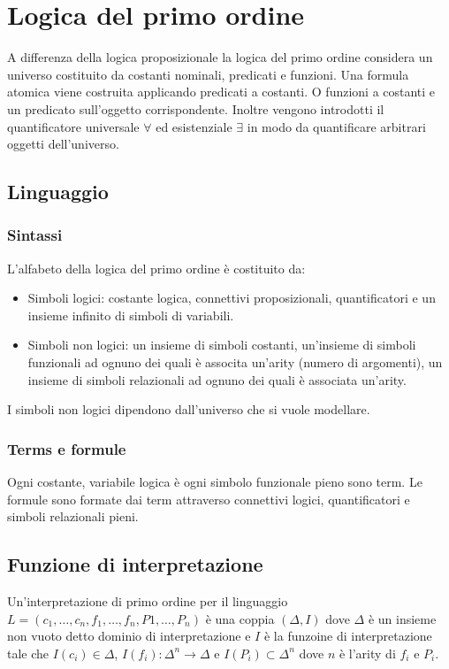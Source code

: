 \chapter{Logica del primo ordine}
A differenza della logica proposizionale la logica del primo ordine considera un universo costituito da costanti nominali, predicati e funzioni. Una formula
atomica viene costruita applicando predicati a costanti. O funzioni a costanti e un predicato sull'oggetto corrispondente. Inoltre vengono introdotti il 
quantificatore universale $\forall$ ed esistenziale $\exists$ in modo da quantificare arbitrari oggetti dell'universo. 
\section{Linguaggio}
\subsection{Sintassi}
L'alfabeto della logica del primo ordine \`e costituito da:
\begin{itemize}
\item Simboli logici: costante logica, connettivi proposizionali, quantificatori e un insieme infinito di simboli di variabili. 
\item Simboli non logici: un insieme di simboli costanti, un'insieme di simboli funzionali ad ognuno dei quali \`e associta un'arity (numero di argomenti), 
un insieme di simboli relazionali ad ognuno dei quali \`e associata un'arity. 
\end{itemize}
I simboli non logici dipendono dall'universo che si vuole modellare.
\subsection{Terms e formule}
Ogni costante, variabile logica \`e ogni simbolo funzionale pieno sono term. Le formule sono formate dai term attraverso connettivi logici, quantificatori e 
simboli relazionali pieni. 
\section{Funzione di interpretazione}
Un'interpretazione di primo ordine per il linguaggio $L=(c_1, \dots, c_n, f_1, \dots, f_n, P1, \dots, P_n)$ \`e una coppia $(\Delta, I)$ dove $\Delta$ \`e un insieme non vuoto detto dominio di interpretazione e 
$I$ \`e la funzoine di interpretazione tale che $I(c_i)\in\Delta$, $I(f_i): \Delta^n\rightarrow\Delta$ e $I(P_i)\subset\Delta^n$ dove $n$ \`e l'arity di $f_i$ e $P_i$. 
